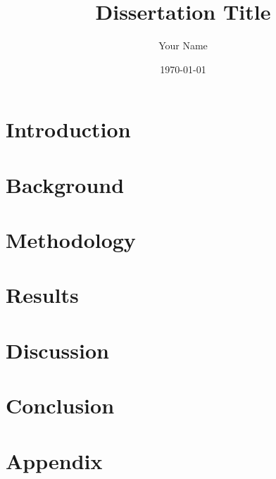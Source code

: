 \documentclass[12pt]{report}
\begin{document}
\title{Dissertation Title}
\author{Your Name}
\date{\today}
\maketitle

\begin{abstract}
\end{abstract}

\tableofcontents
\chapter{Introduction}

\chapter{Background}

\chapter{Methodology}

\chapter{Results}

\chapter{Discussion}

\chapter{Conclusion}

\appendix
\chapter{Appendix}



\end{document}

